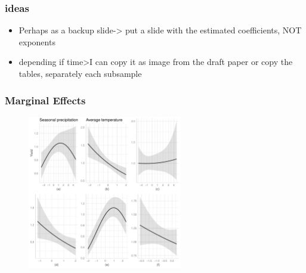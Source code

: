 \documentclass{beamer}              %
\begin{document}





\begin{frame}

\frametitle{ideas}

\begin{itemize}
\color{red}
\item Perhaps as a backup slide-> put a slide with the estimated coefficients, NOT exponents
\item depending if time>I can copy it as image from the draft paper or copy the tables, separately each subsample
\end{itemize}
\color{black}
\end{frame}



\begin{frame}\label{MarginalEffects}

\frametitle{Marginal Effects}
\begin{figure}
    \includegraphics[width = 0.6\textwidth]{Figure1a_1f.pdf}
\end{figure}

\end{frame}
\end{document}

